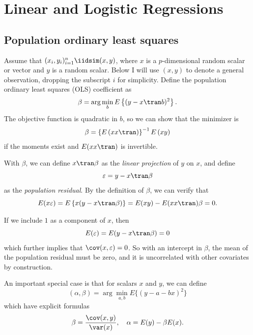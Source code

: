 
\chapter{Linear and Logistic Regressions}
\label{appendix::basic-linear-regression}
 
 \section{Population ordinary least squares}\label{sec::populationOLS}
 
 
Assume that $(x_{i},y_{i})_{i=1}^{n} \iidsim (x,y)$, where $x $ is a $p$-dimensional random scalar or vector and $y $ is a random scalar. 
Below I will use $(x,y)$ to denote a general observation, dropping the subscript $i$ for simplicity. 
Define the population ordinary least squares (OLS) coefficient as
\[
\beta=\arg\min_{b } E\left\{ (y-x \tran b)^{2}\right\} .
\]
The objective function is quadratic in $b$, so we can show that the minimizer is 
$$
\beta=\left\{ E\left(xx \tran \right)\right\} ^{-1}E\left(xy\right)
$$
if the moments exist and $E(xx \tran )$ is invertible. 

With $\beta$, we can define $x \tran \beta$ as the {\it linear projection} of $y$ on $x$, and define 
\begin{equation}
\varepsilon=y-x \tran \beta\label{eq:populationresidualols}
\end{equation}
as the {\it population residual}. 
By the definition of $\beta$, we can verify that
$$
E(x\varepsilon)=E\left\{ x(y-x \tran \beta)\right\} =E(xy)-E(xx \tran )\beta=0. 
$$


\begin{example}
If we include $1$ as a component of $x$, then 
$$
E(\varepsilon)
=E(y-x \tran \beta)
=0
$$
which further implies that $\cov(x,\varepsilon)=0$.
So with an intercept in $\beta$, the mean of the population residual
must be zero, and it is uncorrelated with other covariates by construction. 
\end{example}


 
\begin{example}
\label{eg::ols1-intercept}
An important special case is that for scalars $x$ and $y$, we can define
$$
(\alpha, \beta)  = \arg\min_{a,b} E \{  (y - a - bx)^2 \}
$$
which have explicit formulas
$$
\beta = \frac{  \cov(x,y) }{\var(x)},\quad 
\alpha = E(y)  - \beta E(x).
$$
\end{example}

